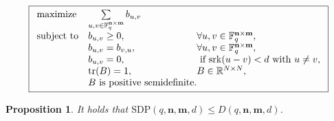 \documentclass[10pt,a4paper]{amsart}
\newtheorem{proposition}{Proposition}
\newcommand{\Del}{D(q,\bfn,\bfm,d)}
\newcommand{\F}{\mathbb{F}}
\newcommand{\bfm}{\mathbf {m}}
\newcommand{\bfn}{\mathbf {n}}
\newcommand{\spac}{\F^{\bfn\times\bfm}_q}
\newcommand{\srk}{\mathrm{srk}}
\DeclareMathOperator{\tr}{tr}
\begin{document}
\begin{equation}\label{eq:DelLP_sdp}
\boxed{
\small
\begin{array}{ll@{}l}
\text{maximize}  &\sum\limits_{u,v\in \spac} b_{u,v} &\\
\text{subject to} &b_{u,v}\geq0,~&\forall u,v\in\spac,\\
&b_{u,v} = b_{v,u},~&\forall u,v\in\spac,\\
&b_{u,v}=0,~& \text{ if }\srk(u-v)<d\text{ with }u\neq v,\\
&\tr(B)=1,~&B\in\mathbb{R}^{N\times N},\\
&B\text{ is positive semidefinite.}
\end{array}
}
\end{equation}

\begin{proposition}\label{prop:comparisonwithdelsarte}
It holds that $\mathrm{SDP}(q,\bfn,\bfm,d)\leq \Del$.
\end{proposition}
\end{document}
